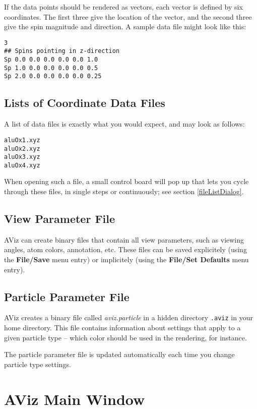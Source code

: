 \documentclass[11pt]{article}
\begin{document}
If the data points should be rendered as vectors, each vector is defined by 
six coordinates.  The first three give the location of the vector, and the 
second three give the spin magnitude and direction.  A sample data file might 
look like this:

\begin{verbatim}
3
## Spins pointing in z-direction
Sp 0.0 0.0 0.0 0.0 0.0 1.0
Sp 1.0 0.0 0.0 0.0 0.0 0.5
Sp 2.0 0.0 0.0 0.0 0.0 0.25
\end{verbatim}

\subsection{Lists of Coordinate Data Files}
\label{fileList}

A list of data files is exactly what you would expect, and may look 
as follows:

\begin{verbatim}
aluOx1.xyz
aluOx2.xyz
aluOx3.xyz
aluOx4.xyz
\end{verbatim}

When opening such a file, a small control board will pop up that lets you 
cycle through these files, in single steps or continuously; see section
\ref{fileListDialog}.  

\subsection{View Parameter File}

AViz can create binary files that contain all view parameters, such as 
viewing angles, atom colors, annotation, etc.  These files can be saved
explicitely (using the {\bf File/Save} menu entry) or implicitely (using the 
{\bf File/Set Defaults} menu entry). 


\subsection{Particle Parameter File}
\label{particleParameterFile}
AViz creates a binary file called {\em aviz.particle} in a hidden directory 
{\tt .aviz} in your home directory.  This file contains information about 
settings that apply to a given particle type -- which color should be used 
in the rendering, for instance.  

The particle parameter file is updated automatically each time you 
change particle type settings.

\section{AViz Main Window}
\end{document}
